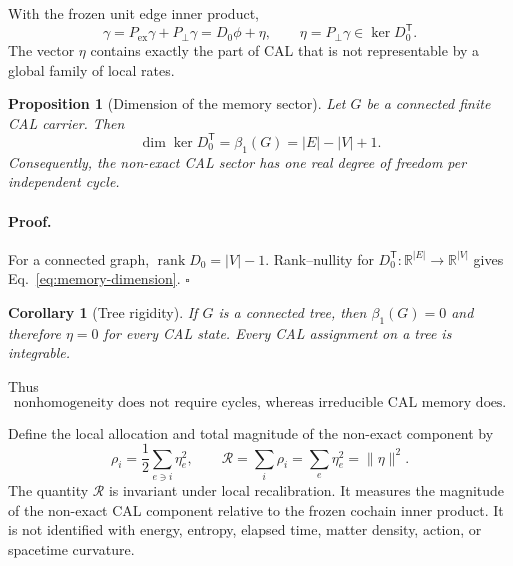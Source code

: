 \documentclass[aip,jmp,amsmath,amssymb,reprint]{revtex4-2}
\newtheorem{proposition}{Proposition}
\newtheorem{corollary}{Corollary}
\newcommand{\Rcal}{\mathcal{R}}
\newcommand{\kerop}{\operatorname{ker}}
\begin{document}
With the frozen unit edge inner product,
\begin{equation}
\gamma=P_{\mathrm{ex}}\gamma+P_\perp\gamma
      =D_0\phi+\eta,
\qquad
\eta=P_\perp\gamma\in\kerop D_0^{\mathsf T}.
\label{eq:hodge-memory-decomposition}
\end{equation}
The vector $\eta$ contains exactly the part of CAL that is not representable by a global family of local rates.

\begin{proposition}[Dimension of the memory sector]\label{prop:memory-dimension}
Let $G$ be a connected finite CAL carrier. Then
\begin{equation}
\dim\kerop D_0^{\mathsf T}=\beta_1(G)=|E|-|V|+1.
\label{eq:memory-dimension}
\end{equation}
Consequently, the non-exact CAL sector has one real degree of freedom per independent cycle.
\end{proposition}

\paragraph*{Proof.}
For a connected graph, $\operatorname{rank}D_0=|V|-1$. Rank--nullity for $D_0^{\mathsf T}:\mathbb R^{|E|}\to\mathbb R^{|V|}$ gives Eq.~\eqref{eq:memory-dimension}. \hfill$\square$

\begin{corollary}[Tree rigidity]\label{cor:tree-rigidity}
If $G$ is a connected tree, then $\beta_1(G)=0$ and therefore $\eta=0$ for every CAL state. Every CAL assignment on a tree is integrable.
\end{corollary}

Thus
\begin{equation}
\boxed{
\text{nonhomogeneity does not require cycles, whereas irreducible CAL memory does.}
}
\label{eq:nonhom-vs-memory}
\end{equation}

Define the local allocation and total magnitude of the non-exact component by
\begin{equation}
\rho_i=\frac12\sum_{e\ni i}\eta_e^2,
\qquad
\Rcal=\sum_i\rho_i=\sum_e\eta_e^2=\lVert\eta\rVert^2.
\label{eq:rho-R}
\end{equation}
The quantity $\Rcal$ is invariant under local recalibration. It measures the magnitude of the non-exact CAL component relative to the frozen cochain inner product. It is not identified with energy, entropy, elapsed time, matter density, action, or spacetime curvature.
\end{document}
